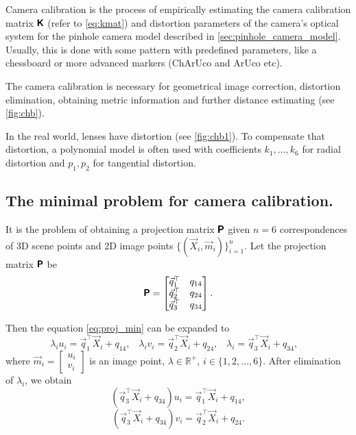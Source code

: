 Camera calibration is the process of empirically estimating the camera calibration matrix $\pmb{\mathsf{K}}$ (refer to \eqref{eq:kmat}) and distortion parameters of the camera's optical system for the pinhole camera model described in \autoref{sec:pinhole_camera_model}.
Usually, this is done with some pattern with predefined parameters, like a chessboard or more advanced markers (ChArUco and ArUco \cite{aruco} etc).

The camera calibration is necessary for geometrical image correction, distortion elimination, obtaining metric information and further distance estimating (see \autoref{fig:chb}). 

In the real world, lenses have distortion (see \autoref{fig:chb1}).
To compensate that distortion, a polynomial model is often used with coefficients $k_1, ... , k_6$ for radial distortion and $p_1, p_2$ for tangential distortion.

\subsection{The minimal problem for camera calibration.} 
It is the problem of obtaining a projection matrix $\pmb{\mathsf{P}}$ given $n=6$ correspondences of 3D scene points and 2D image points $\{(\vec{X}_i, \vec{m}_i)\}_{i=1}^n$.
Let the projection matrix $\pmb{\mathsf{P}}$ be 
\begin{equation}
    \label{eq:p_calib}
    \pmb{\mathsf{P}} = \begin{bmatrix}
        \vec{q}_1^\top & q_{14} \\
        \vec{q}_2^\top & q_{24} \\
        \vec{q}_3^\top & q_{34} \\
    \end{bmatrix}.
\end{equation}

Then the equation \eqref{eq:proj_min} can be expanded to
\begin{equation}
    \lambda_i u_i = \vec{q}_1^\top \vec{X}_i + q_{14}, \;\;\;
    \lambda_i v_i = \vec{q}_2^\top \vec{X}_i + q_{24}, \;\;\;
    \lambda_i = \vec{q}_3^\top \vec{X}_i + q_{34}, \;\;\;
\end{equation}
where $\vec{m}_i = \begin{bmatrix} u_i \\ v_i \end{bmatrix}$ is an image point, $ \lambda \in \mathbb{R}^{+}$, $i \in \{1, 2, ..., 6\}$.
After elimination of $\lambda_i$, we obtain
\begin{equation}
    (\vec{q}_3^\top \vec{X}_i + q_{34})u_i = \vec{q}_1^\top \vec{X}_i + q_{14},
\end{equation}
\begin{equation}
    (\vec{q}_3^\top \vec{X}_i + q_{34})v_i = \vec{q}_2^\top \vec{X}_i + q_{24}.
\end{equation}

